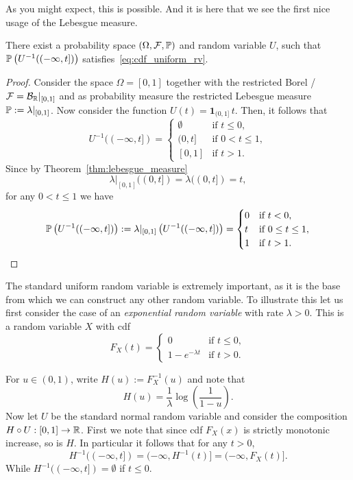 As you might expect, this is possible. And it is here that we see the first nice usage of the Lebesgue measure.

\begin{proposition}\label{prop:uniform_random_variable}
There exist a probability space $(\Omega,\mathcal F, \mathbb P)$ and random variable $U$, such that $\mathbb P\left(U^{-1}((-\infty,t])\right)$ satisfies~\eqref{eq:cdf_uniform_rv}.
\end{proposition}

\begin{proof}
Consider the space $\Omega = [0,1]$ together with the restricted Borel \sigalg/ $\mathcal F = \mathcal B_{\mathbb R}|_{[0,1]}$ and as probability measure the restricted Lebesgue measure $\mathbb P := \lambda|_{[0,1]}$. Now consider the function $U(t) = \mathbf{1}_{(0,1]} \, t$. Then, it follows that
\[
	U^{-1}((-\infty,t]) = \begin{cases}
		\emptyset &\text{if } t \le 0,\\
		(0,t] &\text{if } 0 < t \le 1, \\
		[0,1] &\text{if } t > 1.
	\end{cases}
\]
Since by Theorem~\ref{thm:lebesgue_measure}
\[
	\lambda|_{[0,1]}((0,t]) = \lambda((0,t]) = t,
\]
for any $0 < t \le 1$ we have
\[
	\mathbb P\left(U^{-1}((-\infty,t])\right) := \lambda|_{[0,1]}\left(U^{-1}((-\infty,t])\right)
	= \begin{cases}
		0 &\text{if } t < 0,\\
		t &\text{if } 0 \le t\le 1,\\
		1 &\text{if } t > 1.
	\end{cases}
\]
\end{proof}

The standard uniform random variable is extremely important, as it is the base from which we can construct any other random variable. To illustrate this let us first consider the case of an \emph{exponential random variable} with rate $\lambda > 0$. This is a random variable $X$ with cdf
\[
	F_X(t) = \begin{cases}
		0 &\text{if } t \le 0,\\
		1-e^{-\lambda t} &\text{if } t > 0.
	\end{cases}
\]

For $u \in (0,1)$, write $H(u) := F_X^{-1}(u)$ and note that
\[
	H(u) = \frac{1}{\lambda} \log\left(\frac{1}{1-u}\right).
\]
Now let $U$ be the standard normal random variable and consider the composition $H \circ U : [0,1] \to \mathbb R$. First we note that since cdf $F_X(x)$ is strictly monotonic increase, so is $H$. In particular it follows that for any $t > 0$,
\[
	H^{-1}((-\infty,t]) = (-\infty, H^{-1}(t)] = (-\infty, F_X(t)].
\]
While $H^{-1}((-\infty,t]) = \emptyset$ if $t \le 0$.

